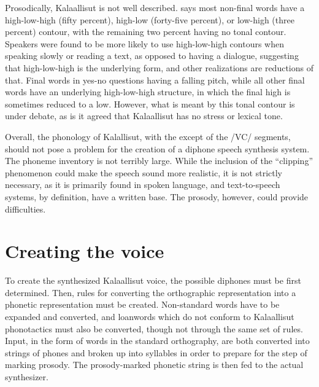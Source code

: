 \documentclass[12pt]{article}
\begin{document}
	Prosodically, Kalaallisut is not well described. \citet{anja} says most non-final words have a high-low-high (fifty percent), high-low (forty-five percent), or low-high (three percent) contour, with the remaining two percent having no tonal contour. Speakers were found to be more likely to use high-low-high contours when speaking slowly or reading a text, as opposed to having a dialogue, suggesting that high-low-high is the underlying form, and other realizations are reductions of that. Final words in yes-no questions having a falling pitch, while all other final words have an underlying high-low-high structure, in which the final high is sometimes reduced to a low. However, what is meant by this tonal contour is under debate, as is it agreed that Kalaallisut has no stress or lexical tone. \par

	Overall, the phonology of Kalallisut, with the except of the /V\textinvscr C/ segments, should not pose a problem for the creation of a diphone speech synthesis system. The phoneme inventory is not terribly large. While the inclusion of the ``clipping'' phenomenon could make the speech sound more realistic, it is not strictly necessary, as it is primarily found in spoken language, and text-to-speech systems, by definition, have a written base. The prosody, however, could provide difficulties. \par

\section{Creating the voice}

To create the synthesized Kalaallisut voice, the possible diphones must be first determined. Then, rules for converting the orthographic representation into a phonetic representation must be created. Non-standard words have to be expanded and converted, and loanwords which do not conform to Kalaallisut phonotactics must also be converted, though not through the same set of rules. Input, in the form of words in the standard orthography, are both converted into strings of phones and broken up into syllables in order to prepare for the step of marking prosody. The prosody-marked phonetic string is then fed to the actual synthesizer. \par
\end{document}
